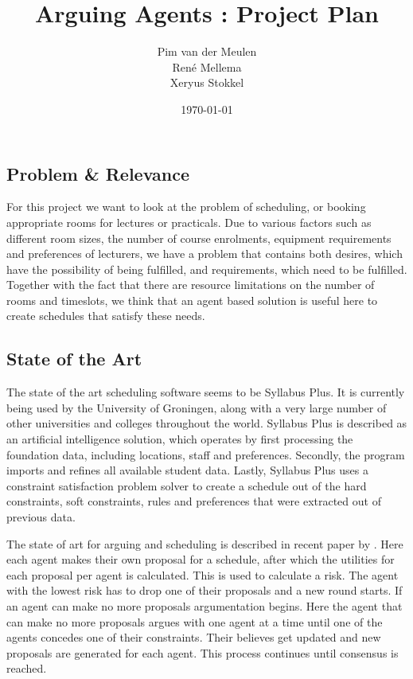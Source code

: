 \documentclass[a4paper]{article}
\title{\textsf{Arguing Agents :} Project Plan}
\author{Pim van der Meulen \\Ren\'e Mellema \\Xeryus Stokkel}
\date{\today}
\begin{document}
\maketitle

\subsection*{Problem \& Relevance}
For this project we want to look at the problem of scheduling, or booking appropriate rooms for lectures or practicals. Due to various factors such as different room sizes, the number of course enrolments, equipment requirements and preferences of lecturers, we have a problem that contains both desires, which have the possibility of being fulfilled, and requirements, which need to be fulfilled. Together with the fact that there are resource limitations on the number of rooms and timeslots, we think that an agent based solution is useful here to create schedules that satisfy these needs.      
 
\subsection*{State of the Art}
The state of the art scheduling software seems to be Syllabus Plus. It is currently being used by the University of Groningen, along with a very large number of other universities and colleges throughout the world. Syllabus Plus is described as an artificial intelligence solution, which operates by first processing the foundation data, including locations, staff and preferences. Secondly, the program imports and refines all available student data. Lastly, Syllabus Plus uses a constraint satisfaction problem solver to create a schedule out of the hard constraints, soft constraints, rules and preferences that were extracted out of previous data. 

The state of art for arguing and scheduling is described in recent paper by \cite{kuo2011multi}. Here each agent makes their own proposal for a schedule, after which the utilities for each proposal per agent is calculated. This is used to calculate a risk. The agent with the lowest risk has to drop one of their proposals and a new round starts. If an agent can make no more proposals argumentation begins. Here the agent that can make no more proposals argues with one agent at a time until one of the agents concedes one of their constraints. Their believes get updated and new proposals are generated for each agent. This process continues until consensus is reached.  
\end{document}
